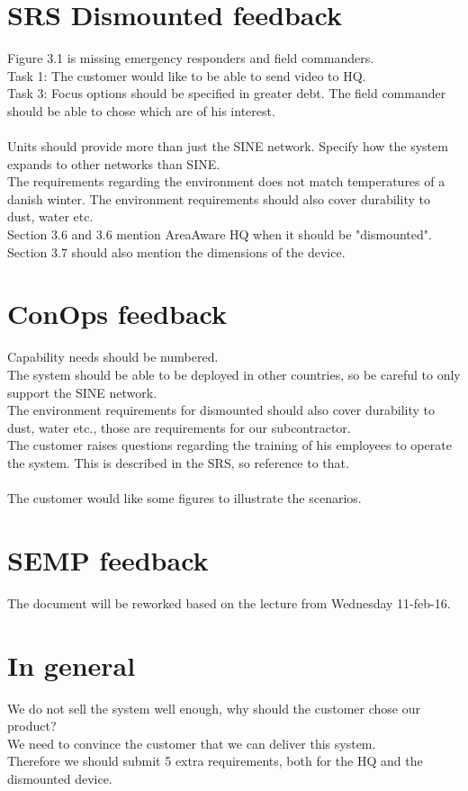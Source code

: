 \section*{SRS Dismounted feedback}
Figure 3.1 is missing emergency responders and field commanders.\\
Task 1: The customer would like to be able to send video to HQ.\\
Task 3: Focus options should be specified in greater debt.
The field commander should be able to chose which are of his interest.\\\\
Units should provide more than just the SINE network.
Specify how the system expands to other networks than SINE.\\
The requirements regarding the environment does not match temperatures of a danish winter.
The environment requirements should also cover durability to dust, water etc.\\
Section 3.6 and 3.6 mention AreaAware HQ when it should be "dismounted".\\
Section 3.7 should also mention the dimensions of the device.

\section*{ConOps feedback}
Capability needs should be numbered.\\
The system should be able to be deployed in other countries, so be careful to only support the SINE network.\\
The environment requirements for dismounted should also cover durability to dust, water etc., those are requirements for our subcontractor.\\
The customer raises questions regarding the training of his employees to operate the system. This is described in the SRS, so reference to that.\\\\
The customer would like some figures to illustrate the scenarios.

\section*{SEMP feedback}
The document will be reworked based on the lecture from Wednesday 11-feb-16.

\section*{In general}
We do not sell the system well enough, why should the customer chose our product?\\
We need to convince the customer that we can deliver this system. \\
Therefore we should submit 5 extra requirements, both for the HQ and the dismounted device.


